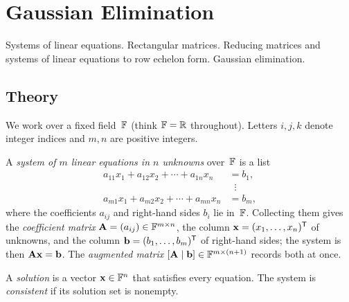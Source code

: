 
\section{Gaussian Elimination}
\label{sec:1.1.01-systems-gauss}

\begin{ticket}
Systems of linear equations. Rectangular matrices. Reducing matrices and systems of linear equations to row echelon form. Gaussian elimination.
\end{ticket}

\subsection*{Theory}

We work over a fixed field~$\mathbb{F}$ (think $\mathbb{F} = \mathbb{R}$ throughout). Letters
$i, j, k$ denote integer indices and $m, n$ are positive integers.

\begin{definition}
\label{def:gauss-system}
A \emph{system of $m$ linear equations in $n$ unknowns} over~$\mathbb{F}$ is a list
\[
  \begin{aligned}
    a_{11} x_1 + a_{12} x_2 + \cdots + a_{1n} x_n &= b_1, \\
    &\;\;\vdots \\
    a_{m1} x_1 + a_{m2} x_2 + \cdots + a_{mn} x_n &= b_m,
  \end{aligned}
\]
where the coefficients $a_{ij}$ and right-hand sides $b_i$ lie in~$\mathbb{F}$.
Collecting them gives the \emph{coefficient matrix}
$\mathbf{A} = (a_{ij}) \in \mathbb{F}^{m \times n}$, the column $\mathbf{x} =
(x_1, \dots, x_n)^{\mathsf{T}}$ of unknowns, and the column $\mathbf{b} = (b_1, \dots, b_m)^{\mathsf{T}}$
of right-hand sides; the system is then $\mathbf{A}\mathbf{x} = \mathbf{b}$. The
\emph{augmented matrix} $[\mathbf{A} \mid \mathbf{b}] \in \mathbb{F}^{m \times (n+1)}$
records both at once.

A \emph{solution} is a vector $\mathbf{x} \in \mathbb{F}^n$ that satisfies every
equation. The system is \emph{consistent} if its solution set is nonempty.
\end{definition}

